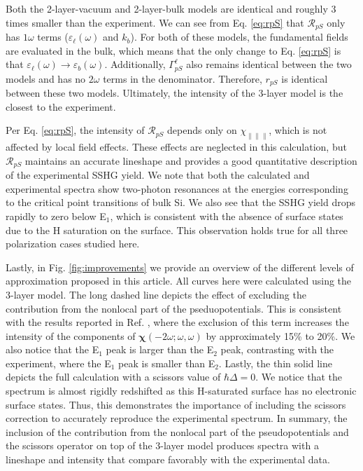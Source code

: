 \documentclass[11pt]{book}
\begin{document}
Both the 2-layer-vacuum and 2-layer-bulk models are identical and roughly 3
times smaller than the experiment. We can see from Eq. \eqref{eq:rpS} that
$\mathcal{R}_{pS}$ only has $1\omega$ terms ($\varepsilon_{\ell}(\omega)$ and
$k_{b}$). For both of these models, the fundamental fields are evaluated in the
bulk, which means that the only change to Eq. \eqref{eq:rpS} is that
$\varepsilon_{\ell}(\omega) \rightarrow \varepsilon_{b}(\omega)$. Additionally,
$\Gamma^{\ell}_{pS}$ also remains identical between the two models and has no
$2\omega$ terms in the denominator. Therefore, $r_{pS}$ is identical between
these two models. Ultimately, the intensity of the 3-layer model is the closest
to the experiment.

Per Eq. \eqref{eq:rpS}, the intensity of $\mathcal{R}_{pS}$ depends only on
$\chi_{\parallel\parallel\parallel}$, which is not affected by local field
effects.\cite{tancognedejean:tel-01235611} These effects are neglected in this
calculation, but $\mathcal{R}_{pS}$ maintains an accurate lineshape and provides
a good quantitative description of the experimental SSHG yield. We note that
both the calculated and experimental spectra show two-photon resonances at the
energies corresponding to the critical point transitions of bulk Si. We also see
that the SSHG yield drops rapidly to zero below E$_{1}$, which is consistent
with the absence of surface states due to the H saturation on the surface. This
observation holds true for all three polarization cases studied here.

Lastly, in Fig. \ref{fig:improvements} we provide an overview of the different
levels of approximation proposed in this article. All curves here were
calculated using the 3-layer model. The long dashed line depicts the effect of
excluding the contribution from the nonlocal part of the pseduopotentials. This
is consistent with the results reported in Ref. \cite{andersonPRB15},
where the exclusion of this term increases the intensity of the components of
$\boldsymbol{\chi}(-2\omega;\omega,\omega)$ by approximately 15\% to 20\%. We
also notice that the E$_{1}$ peak is larger than the E$_{2}$ peak, contrasting
with the experiment, where the E$_{1}$ peak is smaller than E$_{2}$. Lastly, the
thin solid line depicts the full calculation with a scissors value of
$\hbar\Delta = 0$. We notice that the spectrum is almost rigidly redshifted as
this H-saturated surface has no electronic surface states.\cite{andersonPRB15}
Thus, this demonstrates the importance of including the scissors correction to
accurately reproduce the experimental spectrum. In summary, the inclusion of the
contribution from the nonlocal part of the pseudopotentials and the scissors
operator on top of the 3-layer model produces spectra with a lineshape and
intensity that compare favorably with the experimental data.
\end{document}
